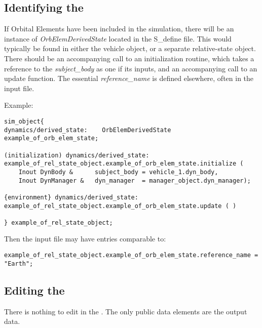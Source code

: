 %
%
% 
%

\label{sec:orbelemuseranalysis}

\subsection{Identifying the \OrbElemDescT}
If Orbital Elements have been included in the simulation, there will be an instance of \textit{OrbElemDerivedState} located in the S\_define file.  This would typically be found in either the vehicle object, or a separate relative-state object.  There should be an accompanying call to an initialization routine, which takes a reference to the \textit{subject\_body} as one if its inputs, and an accompanying call to an update function.  The essential \textit{reference\_name} is defined elsewhere, often in the input file.

Example:
\begin{verbatim}
sim_object{
dynamics/derived_state:    OrbElemDerivedState example_of_orb_elem_state;

(initialization) dynamics/derived_state:
example_of_rel_state_object.example_of_orb_elem_state.initialize (
    Inout DynBody &      subject_body = vehicle_1.dyn_body,
    Inout DynManager &   dyn_manager  = manager_object.dyn_manager);
    
{environment} dynamics/derived_state:
example_of_rel_state_object.example_of_orb_elem_state.update ( )

} example_of_rel_state_object;
\end{verbatim}

Then the input file may have entries comparable to:
\begin{verbatim}
example_of_rel_state_object.example_of_orb_elem_state.reference_name = "Earth";
\end{verbatim}


\subsection{Editing the \OrbElemDescT}
There is nothing to edit in the \OrbElemDesc.  The only public data elements are the output data.

